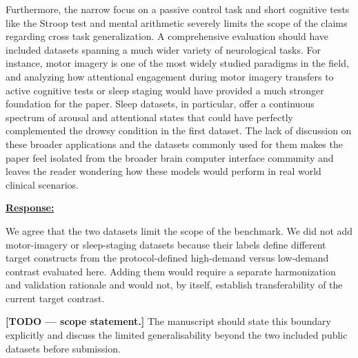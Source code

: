 \documentclass{article}
\begin{document}
\begin{cmt}{}{}

Furthermore, the narrow focus on a passive control task and short cognitive
tests like the Stroop test and mental arithmetic severely limits the scope of
the claims regarding cross task generalization. A comprehensive evaluation
should have included datasets spanning a much wider variety of neurological
tasks. For instance, motor imagery is one of the most widely studied paradigms
in the field, and analyzing how attentional engagement during motor imagery
transfers to active cognitive tests or sleep staging would have provided a much
stronger foundation for the paper. Sleep datasets, in particular, offer a
continuous spectrum of arousal and attentional states that could have perfectly
complemented the drowsy condition in the first dataset. The lack of discussion
on these broader applications and the datasets commonly used for them makes the
paper feel isolated from the broader brain computer interface community and
leaves the reader wondering how these models would perform in real world
clinical scenarios.

\end{cmt}
\vspace{0.1cm}
\noindent
\underline{\textbf{Response:}}
\vspace{0.2cm}

We agree that the two datasets limit the scope of the benchmark. We did not add
motor-imagery or sleep-staging datasets because their labels define different
target constructs from the protocol-defined high-demand versus low-demand
contrast evaluated here. Adding them would require a separate harmonization and
validation rationale and would not, by itself, establish transferability of the
current target contrast.

\textbf{[TODO --- scope statement.]}
The manuscript should state this boundary explicitly and discuss the limited
generalisability beyond the two included public datasets before submission.

\vspace{0.3cm}
\end{document}
